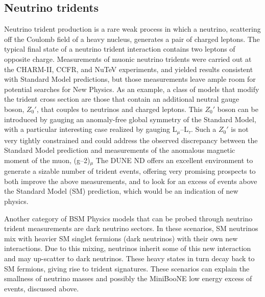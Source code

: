\subsection{Neutrino tridents}
 Neutrino trident production is a rare weak process in which a neutrino, scattering off the Coulomb
 field of a heavy nucleus, generates a pair of charged leptons. The typical final state of a neutrino
 trident interaction contains two leptons of opposite charge. Measurements of muonic neutrino
 tridents were carried out at the CHARM-II, CCFR, and NuTeV experiments, and yielded results
 consistent with Standard Model predictions, but those measurements leave ample room for 
 potential searches for New Physics. As an example, a class of models that modify the trident cross
 section are those that contain an additional neutral gauge boson, $Z_0'$, 
 that couples to neutrinos and charged leptons. This $Z_0'$
 boson can be introduced by gauging an anomaly-free global symmetry
of the Standard Model, with a particular interesting case realized by gauging L$_{\mu}$--L$_{\tau}$. Such a $Z_0'$
 is not very tightly constrained and could address the observed discrepancy between the Standard
Model prediction and measurements of the anomalous magnetic moment of the muon, (g--2)$_{\mu}$
 The DUNE ND offers an excellent environment to generate a sizable number of trident events,
  offering very promising prospects to both improve the above measurements, and to
 look for an excess of events above the Standard Model (SM) prediction, which would be an 
  indication of new physics. 
  
  Another category of BSM Physics
 models that can be probed through neutrino trident measurements are dark neutrino sectors. In
 these scenarios, SM neutrinos mix with heavier SM singlet fermions (dark neutrinos) with their
 own new interactions. Due to this mixing, neutrinos inherit some of this new interaction and may
 up-scatter to dark neutrinos. These heavy states in turn decay back to SM fermions, giving rise
 to trident signatures. These scenarios can explain the smallness of neutrino masses and possibly
 the MiniBooNE low energy excess of events, discussed above.

